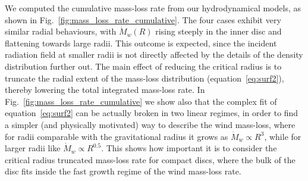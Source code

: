 \documentclass[letters,fleqn,usenatbib]{mnras}
\begin{document}
We computed the cumulative mass-loss rate from our hydrodynamical models, as shown in Fig.~\ref{fig:mass_loss_rate_cumulative}. The four cases exhibit very similar radial behaviours, with $\dot{M}_w(R)$ rising steeply in the inner disc and flattening towards large radii. This outcome is expected, since the incident radiation field at smaller radii is not directly affected by the details of the density distribution further out.
The main effect of reducing the critical radius is to truncate the radial extent of the mass-loss distribution (equation~\ref{eq:surf2}), thereby lowering the total integrated mass-loss rate.
In Fig.~\ref{fig:mass_loss_rate_cumulative} we show also that the complex fit of equation~\ref{eq:surf2} can be actually broken in two linear regimes, in order to find a simpler (and physically motivated) way to describe the wind mass-loss, where for radii comparable with the gravitational radius it grows as $\dot{M}_w \propto R^3$, while for larger radii like $\dot{M}_w \propto R^{0.5}$. This shows how important it is to consider the critical radius truncated mass-loss rate for compact discs, where the bulk of the disc fits inside the fast growth regime of the wind mass-loss rate.
\end{document}
